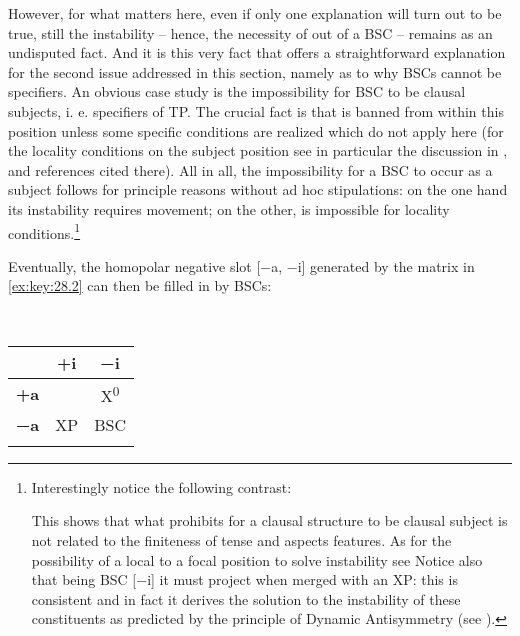 \documentclass[output=paper]{langsci/langscibook}
\begin{document}
\largerpage[-2]
However, for what matters here, even if only one explanation will turn out to
be true, still the instability – hence, the necessity of  out of a \gls{BSC}
– remains as an undisputed fact. And it is this very fact that offers a
straightforward explanation for the second issue addressed in this section,
namely as to why \glspl{BSC} cannot be specifiers. An obvious case study is the
impossibility for \gls{BSC} to be clausal subjects, i. e. specifiers of TP.  The
crucial fact is that  is banned from within this position unless some
specific conditions are realized which do not apply here (for the locality
conditions on the subject position see in particular the discussion in
\citealt{Rizzi2015}, \citealt{Stepanov2007} and references cited there). All
in all, the impossibility for a \gls{BSC} to occur as a subject follows for principle
reasons without ad hoc stipulations: on the one hand its instability requires
movement; on the other,  is impossible for locality
conditions.\footnote{Interestingly notice the following contrast:

\begin{exe}
    \begin{xlist}
    \end{xlist}
\end{exe}

This shows that what prohibits for a clausal structure to be clausal subject is
not related to the finiteness of tense and aspects features. As for the
possibility of a local  to a focal position to solve instability see
\citet{Moro2009} Notice also that being \gls{BSC} [−i] it must project when merged
with an XP\@: this is consistent and in fact it derives the solution to the
instability of these constituents as predicted by the principle of Dynamic
Antisymmetry (see
\citealt{Moro2000,Moro2009,Chomsky2013,Chomsky2017,ChoGalOtt2019,Rizzi2015,Rizzi2016}).}

Eventually, the homopolar negative slot [−a, −i] generated by the matrix in
\eqref{ex:key:28.2} can then be filled in by \glspl{BSC}:

\ea\label{ex:key:28.4}\leavevmode\\[-1\baselineskip]
    \begin{tabular}{ccc}
    \lsptoprule
                & \textbf{+i} & \textbf{−i}\\
    \midrule
    \textbf{+a} &             & X\textsuperscript{0}\\
    \textbf{−a} & XP          & BSC\\
    \lspbottomrule
    \end{tabular}
\z
\end{document}
